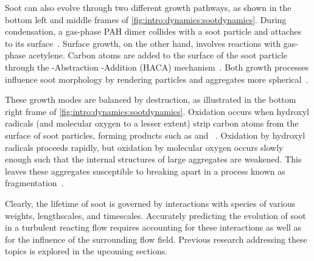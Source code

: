 Soot can also evolve through two different growth pathways, as shown in the bottom left and middle frames of \cref{fig:intro:dynamics:sootdynamics}. During condensation, a gas-phase PAH dimer collides with a soot particle and attaches to its surface~\cite{hmom2009,blanquart2009}. Surface growth, on the other hand, involves reactions with gas-phase acetylene. Carbon atoms are added to the surface of the soot particle through the -Abstraction -Addition (HACA) mechanism~\cite{frenklach1985,frenklach1991}. Both growth processes influence soot morphology by rendering particles and aggregates more spherical~\cite{mitchell1998,mitchell2003,park2003}.

These growth modes are balanced by destruction, as illustrated in the bottom right frame of \cref{fig:intro:dynamics:sootdynamics}. Oxidation occurs when hydroxyl radicals (and molecular oxygen to a lesser extent) strip carbon atoms from the surface of soot particles, forming products such as  and ~\cite{kazakov1995,neoh1981,stanmore2001}. Oxidation by hydroxyl radicals proceeds rapidly, but oxidation by molecular oxygen occurs slowly enough such that the internal structures of large aggregates are weakened. This leaves these aggregates susceptible to breaking apart in a process known as fragmentation~\cite{mueller2011,neoh1985}.

Clearly, the lifetime of soot is governed by interactions with species of various weights, lengthscales, and timescales. Accurately predicting the evolution of soot in a turbulent reacting flow requires accounting for these interactions as well as for the influence of the surrounding flow field. Previous research addressing these topics is explored in the upcoming sections.

